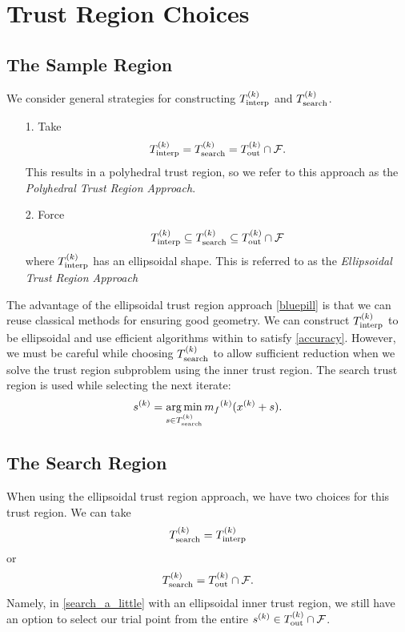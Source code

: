 
\section{Trust Region Choices}
\subsection{The Sample Region}
\label{sample_region_choices}
We consider general strategies for constructing $ {T_{\text{interp}}^{(k)}} $ and $ {T_{\text{search}}^{(k)}} $.
\begin{itemize}
\item[1.] Take 
\begin{align}
\label{redpill} {T_{\text{interp}}^{(k)}} = {T_{\text{search}}^{(k)}} = {T_{\text{out}}^{(k)}} \cap {\mathcal F}.
\end{align} This results in a polyhedral trust region, so we refer to this approach as the \emph{Polyhedral Trust Region Approach}.
\item[2.] Force 
\begin{align}\label{bluepill} {T_{\text{interp}}^{(k)}} \subseteq {T_{\text{search}}^{(k)}} \subseteq {T_{\text{out}}^{(k)}} \cap {\mathcal F}
\end{align} where ${T_{\text{interp}}^{(k)}}$ has an ellipsoidal shape. This is referred to as the \emph{Ellipsoidal Trust Region Approach}
\end{itemize}

The advantage of the ellipsoidal trust region approach \cref{bluepill} is that we can reuse classical methods for ensuring good geometry.
We can construct ${T_{\text{interp}}^{(k)}}$ to be ellipsoidal and use efficient algorithms within \cite{introduction_book} to satisfy \cref{accuracy}.
However, we must be careful while choosing $ {T_{\text{search}}^{(k)}}$ to allow sufficient reduction when we solve the trust region subproblem using the inner trust region.
The search trust region is used while selecting the next iterate:
\begin{align*}
{{s}^{(k)}} = \operatorname*{arg\,min}_{s \in {T_{\text{search}}^{(k)}}} {{m}_f}^{(k)}(x^{(k)} + s).
\end{align*}

\subsection{The Search Region}
\label{search_region_choices}
When using the ellipsoidal trust region approach, we have two choices for this trust region.
We can take
\begin{align}
{T_{\text{search}}^{(k)}} = {T_{\text{interp}}^{(k)}} \label{search_a_little}
\end{align}
or
\begin{align}
{T_{\text{search}}^{(k)}} = {T_{\text{out}}^{(k)}} \cap {\mathcal F} \label{search_a_lot}.
\end{align}
Namely, in \cref{search_a_little} with an ellipsoidal inner trust region, we still have an option to select our trial point from the entire ${{s}^{(k)}} \in {T_{\text{out}}^{(k)}} \cap {\mathcal F}$.

